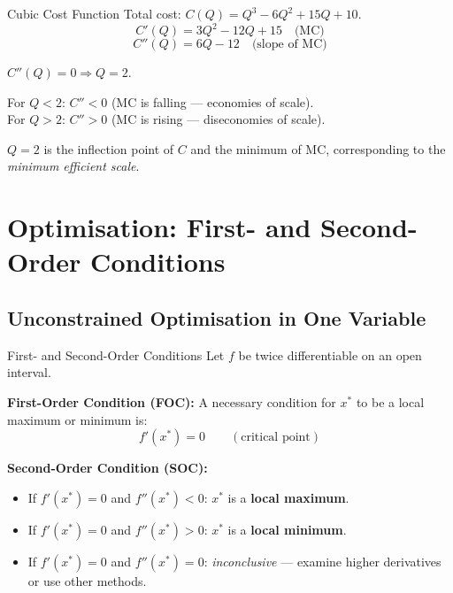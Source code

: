 \documentclass[12pt, a4paper]{article}
\theoremstyle{definition}
\begin{document}
\begin{exbox}{Cubic Cost Function}
Total cost: $C(Q) = Q^3 - 6Q^2 + 15Q + 10$.
\[
  C'(Q) = 3Q^2 - 12Q + 15 \quad\text{(MC)}
\]
\[
  C''(Q) = 6Q - 12 \quad\text{(slope of MC)}
\]

$C''(Q) = 0 \Rightarrow Q = 2$.

For $Q < 2$: $C'' < 0$ (MC is falling --- economies of scale).\\
For $Q > 2$: $C'' > 0$ (MC is rising --- diseconomies of scale).

$Q = 2$ is the inflection point of $C$ and the minimum of MC, corresponding
to the \emph{minimum efficient scale}.
\end{exbox}

\section{Optimisation: First- and Second-Order Conditions}

\subsection{Unconstrained Optimisation in One Variable}

\begin{thmbox}{First- and Second-Order Conditions}
Let $f$ be twice differentiable on an open interval.

\textbf{First-Order Condition (FOC):} A necessary condition for $x^*$ to be
a local maximum or minimum is:
\[
  f'(x^*) = 0 \qquad (\text{critical point})
\]

\textbf{Second-Order Condition (SOC):}
\begin{itemize}
  \item If $f'(x^*) = 0$ and $f''(x^*) < 0$: $x^*$ is a \textbf{local maximum}.
  \item If $f'(x^*) = 0$ and $f''(x^*) > 0$: $x^*$ is a \textbf{local minimum}.
  \item If $f'(x^*) = 0$ and $f''(x^*) = 0$: \emph{inconclusive} --- examine
    higher derivatives or use other methods.
\end{itemize}
\end{thmbox}
\end{document}
